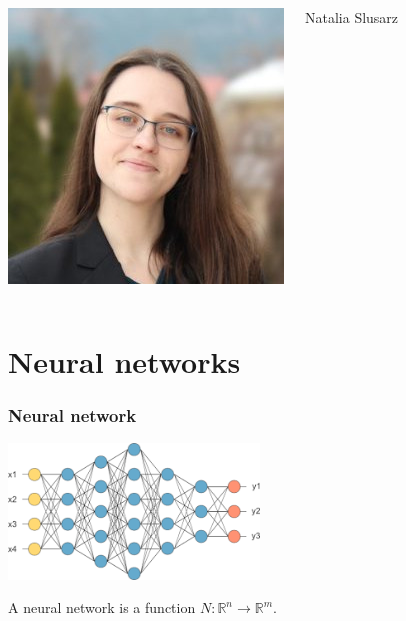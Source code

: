 \documentclass[t,compress,aspectratio=169]{beamer}
\begin{document}
\begin{frame}
\begin{columns}
   	\includegraphics[width=\picwidth]{img/Natalia.jpg}
    \begin{block}		  
	{\centering\footnotesize{Natalia Slusarz}}
    \end{block}
    
  	\end{columns}
\end{frame}


\section{Neural networks}

\begin{frame}
\frametitle{Neural network}

\centering\includegraphics[width=0.5\textwidth]{img/NN.png}

\vspace{1em}

A neural network is a function $N : \mathbb{R}^n \rightarrow \mathbb{R}^m$.

\end{frame}
\end{document}
